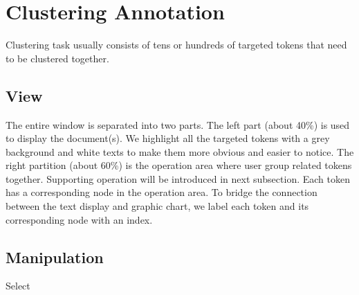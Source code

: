 \section{Clustering Annotation}

Clustering task usually consists of tens or hundreds of targeted tokens that need to be clustered together. 

\subsection{View}

The entire window is separated into two parts. The left part (about 40\%) is used to display the document(s). We highlight all the targeted tokens with a grey background and white texts to make them more obvious and easier to notice. The right partition (about 60\%) is the operation area where user group related tokens together. Supporting operation will be introduced in next subsection. Each token has a corresponding node in the operation area. To bridge the connection between the text display and graphic chart, we label each token and its corresponding node with an index.

\subsection{Manipulation}

Select